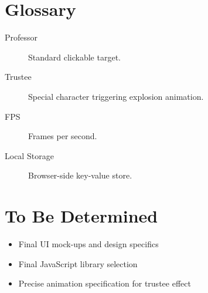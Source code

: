 \documentclass[11pt]{scrreprt}
\begin{document}

\appendix

\chapter{Glossary}
\begin{description}
  \item[Professor] Standard clickable target.
  \item[Trustee] Special character triggering explosion animation.
  \item[FPS] Frames per second.
  \item[Local Storage] Browser-side key-value store.
\end{description}


\chapter{To Be Determined}
\begin{itemize}
  \item Final UI mock-ups and design specifics
  \item Final JavaScript library selection
  \item Precise animation specification for trustee effect
\end{itemize}
\end{document}
